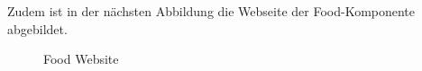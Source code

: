 Zudem ist in der nächsten Abbildung die Webseite der Food-Komponente abgebildet.
\begin{figure}[htbp]
	\centering
	\caption{Food Website}
\end{figure}
